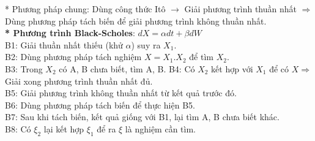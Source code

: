 \documentclass[12pt,a4paper]{article}
\begin{document}
* Phương pháp chung: Dùng công thức Itô $\rightarrow$ Giải phương trình thuần nhất $\Rightarrow$ Dùng phương pháp tách biến để giải phương trình không thuần nhất.\\
\textbf{* Phương trình Black-Scholes}: $dX=\alpha dt+\beta dW$\\
B1: Giải thuần nhất thiếu (khử $\alpha$) suy ra $X_1$.\\
B2: Dùng phương pháp tách nghiệm $X=X_1.X_2$ để tìm $X_2$.\\
B3: Trong $X_2$ có A, B chưa biết, tìm A, B.
B4: Có $X_2$ kết hợp với $X_1$ để có $X\Rightarrow$ Giải xong phương trình thuần nhất đủ.\\
B5: Giải phương trình không thuần nhất từ kết quả trước đó.\\
B6: Dùng phương pháp tách biến để thực hiện B5.\\
B7: Sau khi tách biến, kết quả giống với B1, lại tìm A, B chưa biết khác.\\
B8: Có $\xi_2$ lại kết hợp $\xi_1$ để ra $\xi$ là nghiệm cần tìm.
\end{document}
